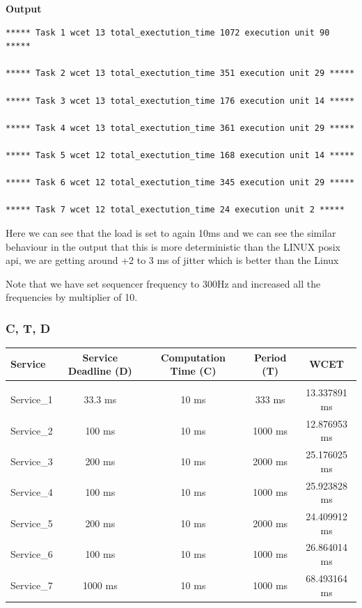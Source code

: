 \documentclass[a4paper,11pt]{article}%
\newenvironment{qanda}{\setlength{\parindent}{0pt}}{\bigskip}
\begin{document}
\begin{qanda}
\begin{enumerate}
			\textbf{Output}
			\begin{lstlisting}
***** Task 1 wcet 13 total_exectution_time 1072 execution unit 90 *****

***** Task 2 wcet 13 total_exectution_time 351 execution unit 29 *****

***** Task 3 wcet 13 total_exectution_time 176 execution unit 14 *****

***** Task 4 wcet 13 total_exectution_time 361 execution unit 29 *****

***** Task 5 wcet 12 total_exectution_time 168 execution unit 14 *****

***** Task 6 wcet 12 total_exectution_time 345 execution unit 29 *****

***** Task 7 wcet 12 total_exectution_time 24 execution unit 2 *****
			\end{lstlisting}


			Here we can see that the load is set to again 10ms and we can see the similar behaviour in the output that this is more deterministic than the LINUX posix api, we are getting around +2 to 3 ms of jitter which is better than the Linux

			Note that we have set sequencer frequency to 300Hz and increased all the frequencies by multiplier of 10.

			\subsubsection{C, T, D}
			\begin{table}[H]
				\centering
				\begin{tabular}{l c c c c}
					\hline
					\textbf{Service} & \textbf{Service	Deadline (D)} & \textbf{Computation Time (C)} & \textbf{Period (T)} & \textbf{WCET} \\\hline
					                 &                              &                                                                     \\
					Service\_1       & 33.3 ms                      & 10 ms                         & 333 ms              & 13.337891 ms  \\
					Service\_2       & 100 ms                       & 10 ms                         & 1000 ms             & 12.876953 ms  \\
					Service\_3       & 200 ms                       & 10 ms                         & 2000 ms             & 25.176025 ms  \\
					Service\_4       & 100 ms                       & 10 ms                         & 1000 ms             & 25.923828 ms  \\
					Service\_5       & 200 ms                       & 10 ms                         & 2000 ms             & 24.409912 ms  \\
					Service\_6       & 100 ms                       & 10 ms                         & 1000 ms             & 26.864014 ms  \\
					Service\_7       & 1000 ms                      & 10 ms                         & 1000 ms             & 68.493164 ms  \\


\end{tabular}
\end{table}
\end{enumerate}
\end{qanda}
\end{document}
